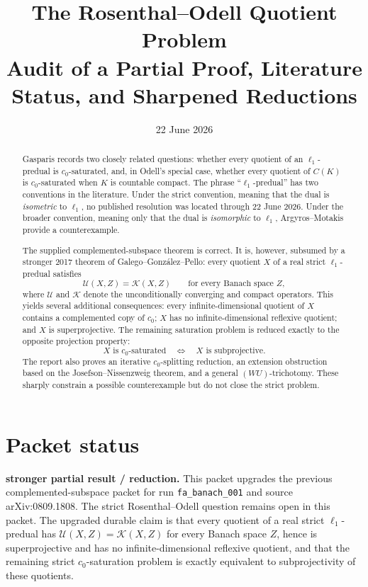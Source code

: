 \documentclass[11pt]{article}
\title{\textbf{The Rosenthal--Odell Quotient Problem}\\
\large Audit of a Partial Proof, Literature Status, and Sharpened Reductions}
\author{}
\date{22 June 2026}
\theoremstyle{definition}
\newcommand{\cU}{\mathcal U}
\newcommand{\cK}{\mathcal K}
\begin{document}
\maketitle

\begin{abstract}
Gasparis records two closely related questions: whether every quotient of an
$\ell_1$-predual is $c_0$-saturated, and, in Odell's special case, whether every
quotient of $C(K)$ is $c_0$-saturated when $K$ is countable compact.  The phrase
``$\ell_1$-predual'' has two conventions in the literature.  Under the strict
convention, meaning that the dual is \emph{isometric} to $\ell_1$, no published
resolution was located through 22 June 2026.  Under the broader convention,
meaning only that the dual is \emph{isomorphic} to $\ell_1$, Argyros--Motakis
provide a counterexample.

The supplied complemented-subspace theorem is correct.  It is, however,
subsumed by a stronger 2017 theorem of Galego--Gonz\'alez--Pello: every quotient
$X$ of a real strict $\ell_1$-predual satisfies
\[
   \cU(X,Z)=\cK(X,Z) \qquad\text{for every Banach space } Z,
\]
where $\cU$ and $\cK$ denote the unconditionally converging and compact
operators.  This yields several additional consequences: every
infinite-dimensional quotient of $X$ contains a complemented copy of $c_0$;
$X$ has no infinite-dimensional reflexive quotient; and $X$ is
superprojective.  The remaining saturation problem is reduced exactly to the
opposite projection property:
\[
  X \text{ is } c_0\text{-saturated}
  \quad\Longleftrightarrow\quad
  X \text{ is subprojective}.
\]
The report also proves an iterative $c_0$-splitting reduction, an extension
obstruction based on the Josefson--Nissenzweig theorem, and a general
$(WU)$-trichotomy.  These sharply constrain a possible counterexample but do
not close the strict problem.
\end{abstract}

\section*{Packet status}

\textbf{stronger partial result / reduction.}  This packet upgrades the
previous complemented-subspace packet for run \texttt{fa\_banach\_001} and
source arXiv:0809.1808.  The strict Rosenthal--Odell question remains open in
this packet.  The upgraded durable claim is that every quotient of a real
strict $\ell_1$-predual has $\cU(X,Z)=\cK(X,Z)$ for every Banach space $Z$,
hence is superprojective and has no infinite-dimensional reflexive quotient,
and that the remaining strict $c_0$-saturation problem is exactly equivalent
to subprojectivity of these quotients.
\end{document}

